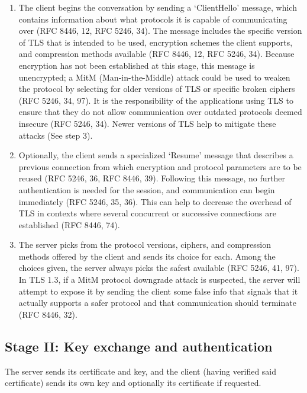 \documentclass[12pt]{article}
\begin{document}
\begin{enumerate}
    \item The client begins the conversation by sending a ‘ClientHello’ message, which contains information about what protocols it is capable of communicating over (RFC 8446, 12, RFC 5246, 34). The message includes the specific version of TLS that is intended to be used, encryption schemes the client supports, and compression methods available (RFC 8446, 12, RFC 5246, 34). Because encryption has not been established at this stage, this message is unencrypted; a MitM (Man-in-the-Middle) attack could be used to weaken the protocol by selecting for older versions of TLS or specific broken ciphers (RFC 5246, 34, 97). It is the responsibility of the applications using TLS to ensure that they do not allow communication over outdated protocols deemed insecure (RFC 5246, 34). Newer versions of TLS help to mitigate these attacks (See step 3).
    \item Optionally, the client sends a specialized ‘Resume’ message that describes a previous connection from which encryption and protocol parameters are to be reused (RFC 5246, 36, RFC 8446, 39). Following this message, no further authentication is needed for the session, and communication can begin immediately (RFC 5246, 35, 36). This can help to decrease the overhead of TLS in contexts where several concurrent or successive connections are established (RFC 8446, 74).
    \item The server picks from the protocol versions, ciphers, and compression methods offered by the client and sends its choice for each. Among the choices given, the server always picks the safest available (RFC 5246, 41, 97). In TLS 1.3, if a MitM protocol downgrade attack is suspected, the server will attempt to expose it by sending the client some false info that signals that it actually supports a safer protocol and that communication should terminate (RFC 8446, 32). 
\end{enumerate}

\subsection{Stage II: Key exchange and authentication}
The server sends its certificate and key, and the client (having verified said certificate) sends its own key and optionally its certificate if requested.
\end{document}
